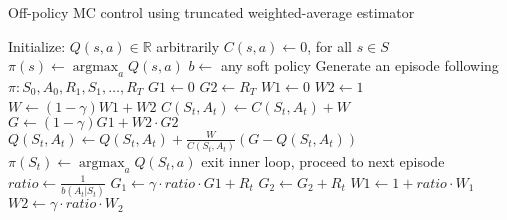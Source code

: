 \documentclass[12pt,a4paper]{article}
\DeclareMathOperator*{\argmax}{argmax}
\begin{document}
\begin{enumerate}
    \begin{algorithm}
      \caption{Off-policy MC control using truncated weighted-average estimator}
      \begin{algorithmic}
        \STATE Initialize:
        \STATE $Q(s, a) \in \mathbb{R}$ arbitrarily
        \STATE $C(s, a) \leftarrow 0$, for all $s \in S$
        \STATE $\pi(s) \leftarrow \argmax_aQ(s, a)$
        \STATE
        \STATE $b \leftarrow$ any soft policy
        \STATE Generate an episode following $\pi: S_0, A_0, R_1, S_1, \dots, R_T$
        \STATE $G1 \leftarrow 0$
        \STATE $G2 \leftarrow R_T$
        \STATE $W1 \leftarrow 0$
        \STATE $W2 \leftarrow 1$
        \STATE $W \leftarrow (1 - \gamma) W1 + W2$
        \STATE $C(S_t, A_t) \leftarrow C(S_t, A_t) + W$
        \STATE $G \leftarrow (1 - \gamma)G1 + W2 \cdot G2$
        \STATE $Q(S_t, A_t) \leftarrow Q(S_t, A_t) + \frac{W}{C(S_t, A_t)}(G - Q(S_t, A_t))$
        \STATE $\pi(S_t) \leftarrow \argmax_aQ(S_t, a)$
        \STATE exit inner loop, proceed to next episode
        \ENDIF
        \STATE $ratio \leftarrow \frac{1}{b(A_t|S_t)}$
        \STATE $G_1 \leftarrow \gamma \cdot ratio \cdot G1 + R_t$
        \STATE $G_2 \leftarrow G_2 + R_t$
        \STATE $W1 \leftarrow 1 + ratio \cdot W_1$
        \STATE $W2 \leftarrow \gamma \cdot ratio \cdot W_2$
        \ENDFOR
        \ENDWHILE
      \end{algorithmic}
    \end{algorithm}

\end{enumerate}
\end{document}
